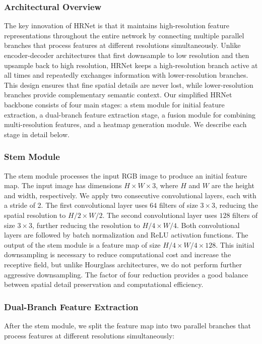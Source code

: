 \subsubsection{Architectural Overview}
The key innovation of HRNet is that it maintains high-resolution feature representations throughout the entire network by connecting multiple parallel branches that process features at different resolutions simultaneously. Unlike encoder-decoder architectures that first downsample to low resolution and then upsample back to high resolution, HRNet keeps a high-resolution branch active at all times and repeatedly exchanges information with lower-resolution branches. This design ensures that fine spatial details are never lost, while lower-resolution branches provide complementary semantic context.
Our simplified HRNet backbone consists of four main stages: a stem module for initial feature extraction, a dual-branch feature extraction stage, a fusion module for combining multi-resolution features, and a heatmap generation module. We describe each stage in detail below.

\subsubsection{Stem Module}
The stem module processes the input RGB image to produce an initial feature map. The input image has dimensions \(H \times W \times 3\), where \(H\) and \(W\) are the height and width, respectively. We apply two consecutive convolutional layers, each with a stride of 2. The first convolutional layer uses \(64\) filters of size \(3 \times 3\), reducing the spatial resolution to \(H/2 \times W/2\). The second convolutional layer uses \(128\) filters of size \(3 \times 3\), further reducing the resolution to \(H/4 \times W/4\). Both convolutional layers are followed by batch normalization and ReLU activation functions.
The output of the stem module is a feature map of size \(H/4 \times W/4 \times 128\). This initial downsampling is necessary to reduce computational cost and increase the receptive field, but unlike Hourglass architectures, we do not perform further aggressive downsampling. The factor of four reduction provides a good balance between spatial detail preservation and computational efficiency.

\subsubsection{Dual-Branch Feature Extraction}
After the stem module, we split the feature map into two parallel branches that process features at different resolutions simultaneously:

